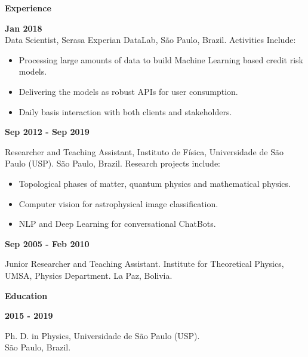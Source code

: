 \documentclass[a4paper,12pt,final]{memoir}
\newcommand{\SmallSep}{\vspace{0.5em}}
\newcommand{\CVSection}[1]
	{\Large\textbf{#1}\par
	\SmallSep\normalsize\normalfont}
\newcommand{\CVItem}[1]
	{\textbf{\color{RoyalBlue} #1}}
\begin{document}
\vspace{-15pt} 
\CVSection{Experience}
\CVItem{Jan 2018}\\
{\small Data Scientist, Serasa Experian DataLab, São Paulo, Brazil. Activities Include:}
\begin{footnotesize}
\begin{itemize}
\item Processing large amounts of data to build Machine Learning based credit risk models.
\item Delivering the models as robust APIs for user consumption.
\item Daily basis interaction with both clients and stakeholders.
\end{itemize}
\end{footnotesize}
\SmallSep

\CVItem{Sep 2012 - Sep 2019}\\
\begin{small}
Researcher and Teaching Assistant,  Instituto de F\'{i}sica, Universidade de S\~{a}o Paulo 
(USP). S\~{a}o Paulo, Brazil. 
Research projects include: 
\end{small}
\begin{footnotesize}
\begin{itemize}
\item Topological phases of matter, quantum physics and mathematical physics.
\item Computer vision for astrophysical image classification.
\item NLP and Deep Learning for conversational ChatBots.
\end{itemize}
\end{footnotesize}

\SmallSep


\CVItem{Sep 2005 - Feb 2010}\\
\begin{small}
Junior Researcher and Teaching Assistant. Institute for Theoretical Physics,
UMSA, Physics Department. La Paz, Bolivia. 
\end{small}

\SmallSep

\CVSection{Education}
\CVItem{2015 - 2019}\\
\begin{small}
 Ph. D. in Physics, Universidade de S\~{a}o Paulo (USP).\\ 
S\~{a}o Paulo, Brazil.
 \end{small} 
\SmallSep
\end{document}
